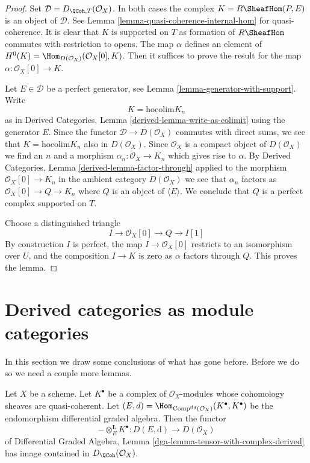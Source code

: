 \begin{proof}
Set $\mathcal{D} = D_{\QCoh, T}(\mathcal{O}_X)$. In both cases the complex
$K = R\SheafHom(P, E)$ is an object of $\mathcal{D}$. See
Lemma \ref{lemma-quasi-coherence-internal-hom} for quasi-coherence.
It is clear that $K$ is supported on $T$ as formation of $R\SheafHom$
commutes with restriction to opens.
The map $\alpha$ defines an element of
$H^0(K) = \Hom_{D(\mathcal{O}_X)}(\mathcal{O}_X[0], K)$.
Then it suffices to prove the result for the map
$\alpha : \mathcal{O}_X[0] \to K$.

\medskip\noindent
Let $E \in \mathcal{D}$ be a perfect generator, see
Lemma \ref{lemma-generator-with-support}. Write
$$
K = \text{hocolim} K_n
$$
as in Derived Categories, Lemma \ref{derived-lemma-write-as-colimit}
using the generator $E$. Since the functor $\mathcal{D} \to D(\mathcal{O}_X)$
commutes with direct sums, we see that $K = \text{hocolim} K_n$
also in $D(\mathcal{O}_X)$. Since $\mathcal{O}_X$ is a compact
object of $D(\mathcal{O}_X)$ we find an $n$ and a morphism
$\alpha_n : \mathcal{O}_X \to K_n$ which gives rise to $\alpha$.
By Derived Categories, Lemma \ref{derived-lemma-factor-through}
applied to the morphism $\mathcal{O}_X[0] \to K_n$ in the ambient
category $D(\mathcal{O}_X)$ we see that $\alpha_n$ factors as
$\mathcal{O}_X[0] \to Q \to K_n$ where $Q$ is an object
of $\langle E \rangle$. We conclude that $Q$ is a perfect complex
supported on $T$.

\medskip\noindent
Choose a distinguished triangle
$$
I \to \mathcal{O}_X[0] \to Q \to I[1]
$$
By construction $I$ is perfect, the map $I \to \mathcal{O}_X[0]$
restricts to an isomorphism over $U$, and the composition
$I \to K$ is zero as $\alpha$ factors through $Q$.
This proves the lemma.
\end{proof}



\section{Derived categories as module categories}
\label{section-derived-is-dga}

\noindent
In this section we draw some conclusions of what has gone before.
Before we do so we need a couple more lemmas.

\begin{lemma}
\label{lemma-tensor-with-QCoh-complex}
Let $X$ be a scheme. Let $K^\bullet$ be a complex of $\mathcal{O}_X$-modules
whose cohomology sheaves are quasi-coherent. Let
$(E, d) = \Hom_{\text{Comp}^{dg}(\mathcal{O}_X)}(K^\bullet, K^\bullet)$
be the endomorphism differential graded algebra. Then the functor
$$
- \otimes_E^\mathbf{L} K^\bullet :
D(E, \text{d}) \longrightarrow D(\mathcal{O}_X)
$$
of
Differential Graded Algebra, Lemma
\ref{dga-lemma-tensor-with-complex-derived}
has image contained in $D_\QCoh(\mathcal{O}_X)$.
\end{lemma}

